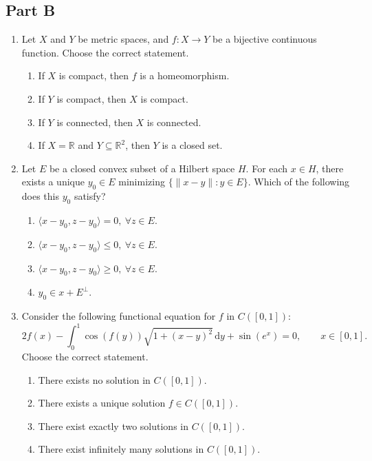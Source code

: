\documentclass[11pt, a4paper]{article}
\begin{document}
\subsection*{Part B}
\begin{enumerate}[resume]
\item Let $X$ and $Y$ be metric spaces, and $f:X\to Y$ be a bijective continuous function. Choose the correct statement.
\begin{enumerate}[label=(\alph*)]
\item If $X$ is compact, then $f$ is a homeomorphism.
\item If $Y$ is compact, then $X$ is compact.
\item If $Y$ is connected, then $X$ is connected.
\item If $X=\mathbb{R}$ and $Y\subseteq\mathbb{R}^2$, then $Y$ is a closed set.
\end{enumerate}

\item Let $E$ be a closed convex subset of a Hilbert space $H$. For each $x\in H$, there exists a unique $y_0\in E$ minimizing $\{\|x-y\|:y\in E\}$. Which of the following does this $y_0$ satisfy?
\begin{enumerate}[label=(\alph*)]
\item $\langle x-y_0,z-y_0\rangle=0,\ \forall z\in E$.
\item $\langle x-y_0,z-y_0\rangle\le0,\ \forall z\in E$.
\item $\langle x-y_0,z-y_0\rangle\ge0,\ \forall z\in E$.
\item $y_0\in x+E^\perp$.
\end{enumerate}

\item Consider the following functional equation for $f$ in $C([0,1])$:
\[ 2f(x)-\int_0^1\cos(f(y))\sqrt{1+(x-y)^2}\,\mathrm{d} y+\sin(e^x)=0,\qquad x\in[0,1]. \]
Choose the correct statement.
\begin{enumerate}[label=(\alph*)]
\item There exists no solution in $C([0,1])$.
\item There exists a unique solution $f\in C([0,1])$.
\item There exist exactly two solutions in $C([0,1])$.
\item There exist infinitely many solutions in $C([0,1])$.
\end{enumerate}


\end{enumerate}
\end{document}
